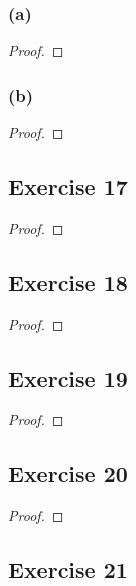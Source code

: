\documentclass[14pt]{extarticle}
\begin{document}
\subsubsection{(a)}

\begin{proof}

\end{proof}

\subsubsection{(b)}

\begin{proof}

\end{proof}

\subsection{Exercise 17}

\begin{proof}

\end{proof}

\subsection{Exercise 18}

\begin{proof}

\end{proof}

\subsection{Exercise 19}

\begin{proof}

\end{proof}

\subsection{Exercise 20}

\begin{proof}

\end{proof}

\subsection{Exercise 21}
\end{document}
